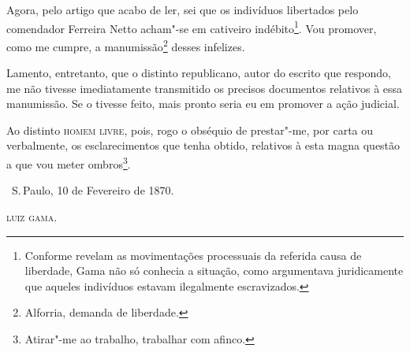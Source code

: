Agora, pelo artigo que acabo de ler, sei que os indivíduos libertados
pelo comendador Ferreira Netto acham"-se em cativeiro indébito\footnote{Conforme revelam as movimentações processuais da referida causa de
  liberdade, Gama não só conhecia a situação, como argumentava
  juridicamente que aqueles indivíduos estavam ilegalmente escravizados.}.
Vou promover, como me cumpre, a manumissão\footnote{Alforria, demanda
  de liberdade.} desses infelizes.

Lamento, entretanto, que o distinto republicano, autor do escrito que
respondo, me não tivesse imediatamente transmitido os precisos
documentos relativos à essa manumissão. Se o tivesse feito, mais pronto
seria eu em promover a ação judicial.

Ao distinto \textsc{homem livre}, pois, rogo o obséquio de prestar"-me, por carta
ou verbalmente, os esclarecimentos que tenha obtido, relativos à esta
magna questão a que vou meter ombros\footnote{Atirar"-me ao trabalho,
  trabalhar com afinco.}.

\bigskip

\hfill\ S.\,Paulo, 10 de Fevereiro de 1870.\smallskip

\hfill\textsc{luiz gama}.

\paginabranca
\thispagestyle{empty}

